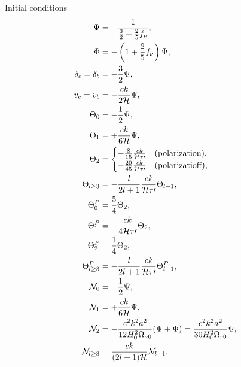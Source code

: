\documentclass[10pt,a4paper]{article}
\begin{document}
Initial conditions
\begin{subequations}
\begin{align}
	\Psi &= -\frac{1}{\frac32 + \frac25 f_\nu}, \\
	\Phi &= -\left( 1 + \frac25 f_\nu \right) \Psi, \\
	\delta_c = \delta_b &= -\frac32 \Psi, \\
	v_c = v_b &= -\frac{ck}{2\mathcal{H}} \Psi, \\
	\Theta_0 &= -\frac12 \Psi, \\
	\Theta_1 &= +\frac{ck}{6\mathcal{H}} \Psi, \\
	\Theta_2 &= \begin{cases} -\frac{8}{15} \frac{ck}{\mathcal{H} \tau\prime} & \text{(polarization)}, \\ -\frac{20}{45} \frac{ck}{\mathcal{H} \tau\prime} & \text{(polarizatioff),} \end{cases} \\
	\Theta_{l \geq 3} &= -\frac{l}{2l+1} \frac{ck}{\mathcal{H} \tau\prime} \Theta_{l-1}, \\
	\Theta^P_0 &= \frac54 \Theta_2, \\
	\Theta^P_1 &= -\frac{ck}{4\mathcal{H}\tau\prime} \Theta_2, \\
	\Theta^P_2 &= \frac14 \Theta_2, \\
	\Theta^P_{l \geq 3} &= -\frac{l}{2l+1} \frac{ck}{\mathcal{H}\tau\prime} \Theta^P_{l-1}, \\
	\mathcal{N}_0 &= -\frac12 \Psi, \\
	\mathcal{N}_1 &= +\frac{ck}{6\mathcal{H}} \Psi, \\
	\mathcal{N}_2 &= -\frac{c^2 k^2 a^2}{12 H_0^2 \Omega_{\nu0}} (\Psi + \Phi) = \frac{c^2 k^2 a^2}{30 H_0^2 \Omega_{r0}} \Psi,\\
	\mathcal{N}_{l \geq 3} &= \frac{ck}{(2l+1)\mathcal{H}} \mathcal{N}_{l-1},
\end{align}
\label{eq_perturb_ic}
\end{subequations}
\end{document}
